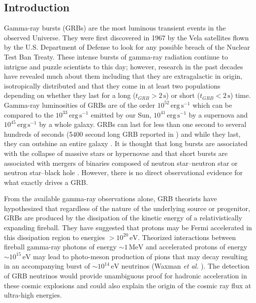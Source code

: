 \documentclass[12pt]{article}
\begin{document}
\newpage
\begin{doublespace}


\section{Introduction}

Gamma-ray bursts (GRBs) are the most luminous transient events in the observed Universe. They were first discovered in 1967 by the Vela satellites flown by the U.S. Department of Defense to look for any possible breach of the Nuclear Test Ban Treaty. These intense bursts of gamma-ray radiation continue to intrigue and puzzle scientists to this day; however, research in the past decades have revealed much about them including that they are extragalactic in origin, isotropically distributed and that they come in at least two populations depending on whether they last for a long ($t_{GRB} > 2 \, \mathrm{s}$) or short ($t_{GRB} < 2 \, \mathrm{s}$) time. Gamma-ray luminosities of GRBs are of the order $10^{52} \, \mathrm{erg \, s^{-1}}$ which can be compared to the $10^{33} \, \mathrm{erg \, s^{-1}}$ emitted by our Sun, $10^{41} \, \mathrm{erg \, s^{-1}}$ by a supernova and $10^{45} \, \mathrm{erg \, s^{-1}}$ by a whole galaxy. GRBs can last for less than one second to several hundreds of seconds (5400 second long GRB reported in \cite{longhardgrb}) and while they last, they can outshine an entire galaxy \cite{Meszaros,MBthesis}. It is thought that long bursts are associated with the collapse of massive stars or hypernovae and that short bursts are associated with mergers of binaries composed of neutron star--neutron star or neutron star--black hole \cite{Meszaros}. However, there is no direct observational evidence for what exactly drives a GRB. \par
From the available gamma-ray observations alone, GRB theorists have hypothesized that regardless of the nature of the underlying source or progenitor, GRBs are produced by the dissipation of the kinetic energy of a relativistically expanding fireball. They have suggested that protons may be Fermi accelerated in this dissipation region to energies $> 10^{20} \, \mathrm{eV}$. Theorized interactions between fireball gamma-ray photons of energy $\sim 1 \, \mathrm{MeV}$ and accelerated protons of energy $\sim 10^{15} \, \mathrm{eV}$ may lead to photo-meson production of pions that may decay resulting in an accompanying burst of $\sim 10^{14} \, \mathrm{eV}$ neutrinos (Waxman \textit{et al.} \cite{Waxmanreview,firstcalc}). The detection of GRB neutrinos would provide unambiguous proof for hadronic acceleration in these cosmic explosions and could also explain the origin of the cosmic ray flux at ultra-high energies.\par

\end{doublespace}
\end{document}
